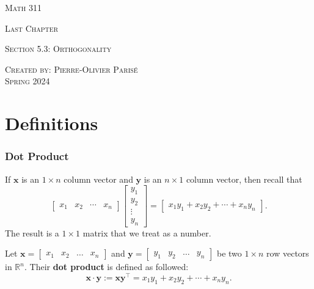 \documentclass[20pt,a4paper]{extarticle}
\newcounter{definition}
\begin{document}
\thispagestyle{empty}

\begin{center}
\vspace*{0.75cm}

{\Huge \textsc{Math 311}}

\vspace*{1.5cm}

{\LARGE \textsc{Last Chapter}} 

\vspace*{0.75cm}

\noindent\textsc{Section 5.3: Orthogonality}

\vspace*{0.25cm}


\begin{footnotesize}

\tableofcontents
\end{footnotesize}

\vfill

\noindent \textsc{Created by: Pierre-Olivier Paris{\'e}} \\
\textsc{Spring 2024}
\end{center}

\newpage

\section{Definitions}

\subsubsection{Dot Product}
If $\mathbf{x}$ is an $1 \times n$ column vector and $\mathbf{y}$ is an $n \times 1$ column vector, then recall that
	\[
		\begin{bmatrix} x_1 & x_2 & \cdots & x_n \end{bmatrix} \begin{bmatrix} y_1 \\ y_2 \\ \vdots \\ y_n \end{bmatrix} = \begin{bmatrix} x_1 y_1 + x_2 y_2 + \cdots + x_n y_n \end{bmatrix} .
	\]
The result is a $1 \times 1$ matrix that we treat as a number.

	\begin{definition}
	Let $\mathbf{x} = \begin{bmatrix} x_1 & x_2 & \ldots & x_n \end{bmatrix}$ and $\mathbf{y} = \begin{bmatrix} y_1 & y_2 & \ldots & y_n \end{bmatrix}$ be two $1 \times n$ row vectors in $\mathbb{R}^n$. Their \textbf{dot product} is defined as followed:
		\[
			\mathbf{x} \cdot \mathbf{y} := \mathbf{x} \mathbf{y}^\top = x_1 y_1 + x_2 y_2 + \cdots + x_n y_n .
		\]
	\end{definition}
\end{document}
